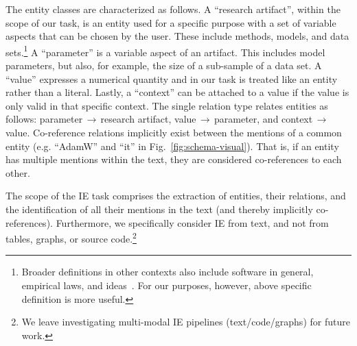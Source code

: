 The entity classes are characterized as follows. A ``research artifact'', within the scope of our task, is an entity used for a specific purpose with a set of variable aspects that can be chosen by the user. These include methods, models, and data sets.\footnote{Broader definitions in other contexts also include software in general, empirical laws, and ideas~\cite{Lin2022}. For our purposes, however, above specific definition is more useful.} A ``parameter'' is a variable aspect of an artifact. This includes model parameters, but also, for example, the size of a sub-sample of a data set. A ``value'' expresses a numerical quantity and in our task is treated like an entity rather than a literal. Lastly, a ``context'' can be attached to a value if the value is only valid in that specific context. The single relation type relates entities as follows: parameter\,$\rightarrow$\,research artifact, value\,$\rightarrow$\,parameter, and context\,$\rightarrow$\,value.
Co-reference relations %
implicitly exist between the mentions of a common entity (e.g. ``AdamW'' and ``it'' in Fig.~\ref{fig:schema-visual}). That is, if an entity has multiple mentions within the text, they are considered co-references to each other.








The scope of the IE task comprises the extraction of entities, their relations, and the identification of all their mentions in the text (and thereby implicitly co-references). %
Furthermore, we specifically consider IE from text, and not from tables, graphs, or source code.\footnote{We leave investigating multi-modal IE pipelines (text/code/graphs) for future work.}

